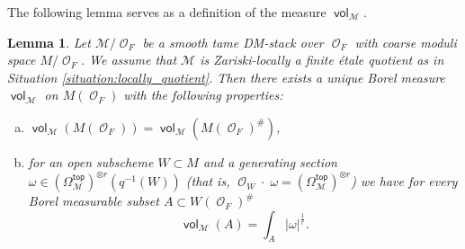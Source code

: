 \documentclass{article}
\DeclareMathOperator{\hash}{\#}
\newcommand{\Mc}{\mathcal{M}}
\DeclareMathOperator{\vol}{\mathsf{vol}}
\DeclareMathOperator{\Oo}{\mathcal{O}}
\renewcommand{\top}{\mathsf{top}}
\theoremstyle{definition}
\theoremstyle{plain}
\newtheorem{lemma}[definition]{Lemma}
\begin{document}
The following lemma serves as a definition of the measure $\vol_{\Mc}$.

\begin{lemma}\label{defcanmes}
Let $\Mc/\Oo_F$ be a smooth tame DM-stack over $\Oo_F$ with coarse moduli space $M/\Oo_F$. We assume that $\Mc$ is Zariski-locally a finite \'etale quotient as in Situation \ref{situation:locally_quotient}. Then there exists a unique Borel measure $\vol_{\Mc}$ on $M(\Oo_F)$ with the following properties:
\begin{enumerate}[(a)]
\item $\vol_{\Mc}(M(\Oo_F)) = \vol_{\Mc}(M(\Oo_F)^{\hash})$,
\item for an open subscheme $W \subset M$ and a generating section $\omega \in (\Omega_{\Mc}^{\top})^{\otimes r}(q^{-1}(W))$ (that is, $\Oo_W \cdot{} \; \omega = (\Omega_{\Mc}^{\top})^{\otimes r}$) we have for every Borel measurable subset $A \subset W(\Oo_F)^{\#}$ 
$$\vol_{\Mc}(A) = \int_{A} |\omega|^{\frac{1}{r}}.$$
\end{enumerate}
\end{lemma}
\end{document}
